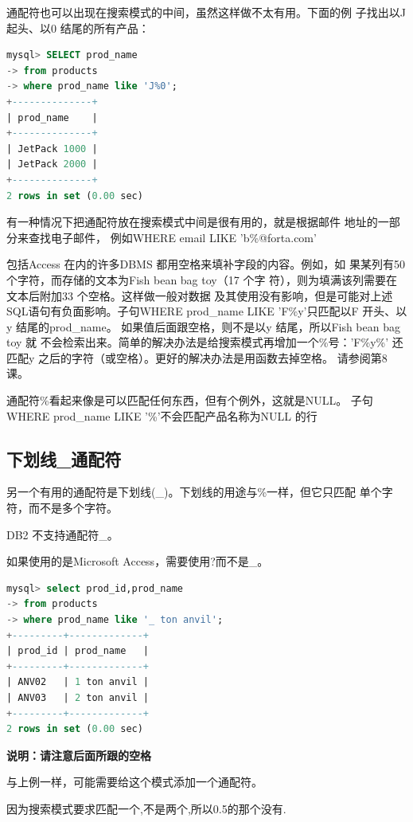 \documentclass[11pt,a4paper,oneside]{book}
\begin{document}
通配符也可以出现在搜索模式的中间，虽然这样做不太有用。下面的例
子找出以J 起头、以0 结尾的所有产品：
\begin{lstlisting}[language=sql]
mysql> SELECT prod_name
-> from products
-> where prod_name like 'J%0';
+--------------+
| prod_name    |
+--------------+
| JetPack 1000 |
| JetPack 2000 |
+--------------+
2 rows in set (0.00 sec)
\end{lstlisting}
有一种情况下把通配符放在搜索模式中间是很有用的，就是根据邮件
地址的一部分来查找电子邮件， 例如WHERE email LIKE
'b\%@forta.com'

包括Access 在内的许多DBMS 都用空格来填补字段的内容。例如，如
果某列有50 个字符，而存储的文本为Fish bean bag toy（17 个字
符），则为填满该列需要在文本后附加33 个空格。这样做一般对数据
及其使用没有影响，但是可能对上述SQL语句有负面影响。子句WHERE
prod\_name LIKE 'F\%y'只匹配以F 开头、以y 结尾的prod\_name。
如果值后面跟空格，则不是以y 结尾，所以Fish bean bag toy 就
不会检索出来。简单的解决办法是给搜索模式再增加一个\%号：'F\%y\%'
还匹配y 之后的字符（或空格）。更好的解决办法是用函数去掉空格。
请参阅第8 课。

通配符\%看起来像是可以匹配任何东西，但有个例外，这就是NULL。
子句WHERE prod\_name LIKE '\%'不会匹配产品名称为NULL 的行

\subsection{下划线\_通配符}
另一个有用的通配符是下划线(\_)。下划线的用途与\%一样，但它只匹配
单个字符，而不是多个字符。
\begin{tcolorbox}[colback=pink!10!white,colframe=pink!100!black]
DB2 不支持通配符\_。
\end{tcolorbox}
\begin{tcolorbox}[colback=pink!10!white,colframe=pink!100!black]
如果使用的是Microsoft Access，需要使用?而不是\_。
\end{tcolorbox}

\begin{lstlisting}[language=sql]
mysql> select prod_id,prod_name
-> from products
-> where prod_name like '_ ton anvil';
+---------+-------------+
| prod_id | prod_name   |
+---------+-------------+
| ANV02   | 1 ton anvil |
| ANV03   | 2 ton anvil |
+---------+-------------+
2 rows in set (0.00 sec)
\end{lstlisting}
\begin{tcolorbox}[colback=pink!10!white,colframe=pink!100!black]
\textbf{说明：请注意后面所跟的空格}

与上例一样，可能需要给这个模式添加一个通配符。
\end{tcolorbox}
因为搜索模式要求匹配一个,不是两个,所以0.5的那个没有.
\end{document}
